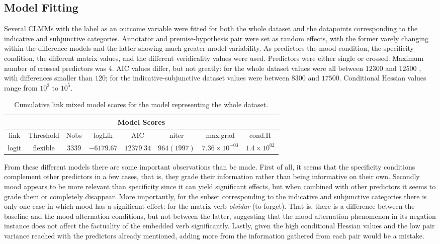\subsection{Model Fitting}\label{subsect:mod}
Several CLMMs with the label as an outcome variable were fitted for both the whole dataset and the datapoints corresponding to the indicative and subjunctive categories. Annotator and premise-hypothesis pair were set as random effects, with the former varely changing within the difference models and the latter showing much greater model variability. As predictors the mood condition, the specificity condition, the different matrix values, and the different veridicality values were used. Predictors were either single or crossed. Maximum number of crossed predictors was 4. AIC values differ, but not greatly: for the whole dataset values were all between $12300$ and $12500$ , with differences smaller than $120$; for the indicative-subjunctive dataset values were between $8300$ and $17500$. Conditional Hessian values range from $10^{2}$ to $10^{5}$.\\

\begin{table}
\center
\begin{tabular}{|c|c|c|c|c|c|c|c|}
\hline
\multicolumn{8}{|c|}{Model Scores}\\\hline
link  &  Threshold & Nobs & logLik & AIC & niter & max.grad & cond.H\\\hline
logit & flexible & $3339$ & $-6179.67$ & $12379.34$ & $964(1997)$ & $7.36\times10^{-03}$ &$1.4\times10^{02}$\\\hline
\end{tabular}
\caption[Model Scores.]{Cumulative link mixed model scores for the model representing the whole dataset.}
\label{tab:modscores}
\end{table}

From these different models there are some important observations than be made. First of all, it seems that the specificity conditions complement other predictors in a few cases, that is, they grade their information rather than being informative on their own. Secondly mood appears to be more relevant than specificity since it can yield significant effects, but when combined with other predictors it seems to grade them or completely disappear. More importantly, for the subset corresponding to the indicative and subjunctive categories there is only one case in which mood has a significant effect: for the matrix verb \textit{olvidar} (to forget). That is, there is a difference between the baseline and the mood alternation conditions, but not between the latter, suggesting that the mood alternation phenomenon in its negation instance does not affect the factuality of the embedded verb significantly. Lastly, given the high conditional Hessian values and the low pair variance reached with the predictors already mentioned, adding more from the information gathered from each pair would be a mistake.\\

